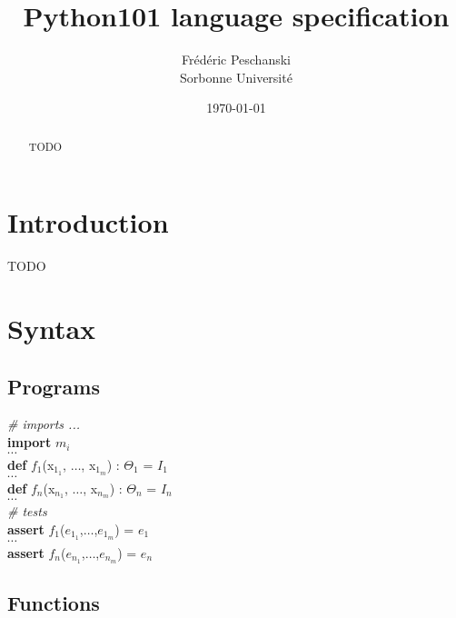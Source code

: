 \documentclass[a4paper]{article}
\newenvironment{program}{
\begin{sffamily}
\begin{scriptsize}
\begin{tabbing}}
{\end{tabbing}
\end{scriptsize}
\end{sffamily}}
\newcommand{\kw}[1]{\textsf{\textbf{#1}}}
\newcommand{\cmt}[1]{\textsf{\textit{#1}}}
\begin{document}
\setlength{\parskip}{1ex}
\setlength{\parindent}{0mm}


\title{Python101 language specification}

\author{Fr\' ed\' eric Peschanski\\
Sorbonne Universit\' e}

\date{\today}

\maketitle
\begin{abstract}
TODO
\end{abstract}

\thispagestyle{fancy}

\section{Introduction}

TODO

\section{Syntax}

\subsection{Programs}

\begin{program}
\cmt{\# imports ...}\\
\kw{import} $m_i$ \\
$\cdots$\\
\kw{def} $f_1$(x$_{1_1}$, $\ldots$, x$_{1_m}$) : $\Theta_1$ = $I_1$\\
$\cdots$ \\
\kw{def} $f_n$(x$_{n_1}$, $\ldots$, x$_{n_m}$)  : $\Theta_n$ = $I_n$\\
$\cdots$\\
\cmt{\# tests} \\
\kw{assert} $f_1$($e_{1_1}$,$\ldots$,$e_{1_m}$) = $e_1$ \\
$\cdots$\\
\kw{assert} $f_n$($e_{n_1}$,$\ldots$,$e_{n_m}$) = $e_n$ \\
\end{program}

\subsection{Functions}
\end{document}
